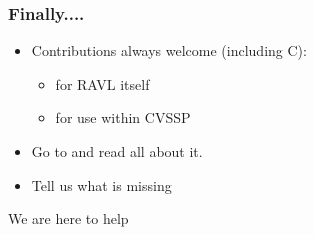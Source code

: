 \documentclass[landscape]{beamer}
\begin{document}
\begin{frame}[fragile]\frametitle{Finally....}


  \begin{itemize}

  \item Contributions always welcome (including C):
    \begin{itemize}
    \item for RAVL itself
    \item for use within CVSSP\\[1em]
    \end{itemize}
    \vfill
    \pause \item Go to
    and read all about it.
    \vfill
    \pause \item \color{red}\huge Tell us what is missing

  \end{itemize}
\end{frame}

\begin{frame}
 \color{code}\Huge\centerline{ We are here to help}
\end{frame}
\end{document}

